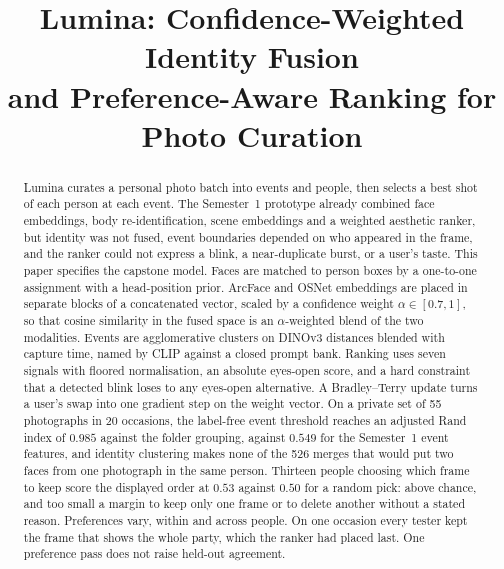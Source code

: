 \documentclass[conference]{IEEEtran}
\begin{document}
\title{Lumina: Confidence-Weighted Identity Fusion\\ and Preference-Aware Ranking for Photo Curation}

\author{
}

\maketitle

\begin{abstract}
Lumina curates a personal photo batch into events and people, then selects a
best shot of each person at each event. The Semester~1 prototype already
combined face embeddings, body re-identification, scene embeddings and a
weighted aesthetic ranker, but identity was not fused, event boundaries
depended on who appeared in the frame, and the ranker could not express a
blink, a near-duplicate burst, or a user's taste. This paper specifies the
capstone model. Faces are matched to person boxes by a one-to-one assignment
with a head-position prior. ArcFace and OSNet embeddings are placed in separate
blocks of a concatenated vector, scaled by a confidence weight $\alpha\in[0.7,1]$,
so that cosine similarity in the fused space is an $\alpha$-weighted blend of
the two modalities. Events are agglomerative clusters on \mbox{DINOv3} distances
blended with capture time, named by CLIP against a closed prompt bank.
Ranking uses seven signals with floored normalisation, an absolute eyes-open
score, and a hard constraint that a detected blink loses to any eyes-open
alternative. A Bradley--Terry update turns a user's swap into one gradient step
on the weight vector. On a private set of 55 photographs in 20 occasions, the
label-free event threshold reaches an adjusted Rand index of $0.985$ against
the folder grouping, against $0.549$ for the Semester~1 event features, and
identity clustering makes none of the 526 merges that would put two faces from
one photograph in the same person. Thirteen people choosing which frame to keep
score the displayed order at $0.53$ against $0.50$ for a random pick: above
chance, and too small a margin to keep only one frame or to delete another
without a stated reason. Preferences vary, within and across people. On one
occasion every tester kept the frame that shows the whole party, which the
ranker had placed last. One preference pass does not raise held-out agreement.
\end{abstract}
\end{document}
